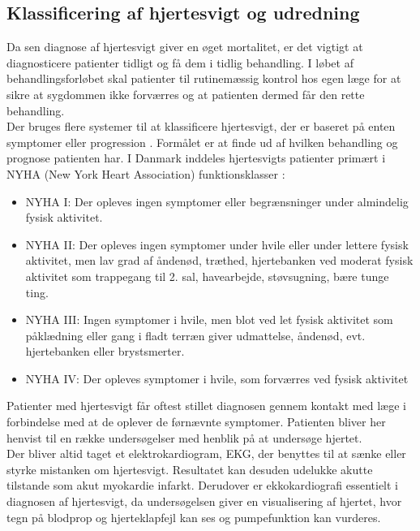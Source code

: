 \subsection{Klassificering af hjertesvigt og udredning}
Da sen diagnose af hjertesvigt giver en øget mortalitet, er det vigtigt at diagnosticere patienter tidligt og få dem i tidlig behandling. I løbet af behandlingsforløbet skal patienter til rutinemæssig kontrol hos egen læge for at sikre at sygdommen ikke forværres og at patienten dermed får den rette behandling. \citep{heartfailure}\\
Der bruges flere systemer til at klassificere hjertesvigt, der er baseret på enten symptomer eller progression \citep{heartfailure}. Formålet er at finde ud af hvilken behandling og prognose patienten har. I Danmark inddeles hjertesvigts patienter primært i NYHA (New York Heart Association) funktionsklasser \citep{DCS}:

\begin{itemize} 
\item NYHA I: Der opleves ingen symptomer eller begrænsninger under almindelig fysisk aktivitet.
\item NYHA II: Der opleves ingen symptomer under hvile eller under lettere fysisk aktivitet, men lav grad af åndenød, træthed, hjertebanken ved moderat fysisk aktivitet som trappegang til 2. sal, havearbejde, støvsugning, bære tunge ting.
\item NYHA III:  Ingen symptomer i hvile, men blot ved let fysisk aktivitet som påklædning eller gang i fladt terræn giver udmattelse, åndenød, evt. hjertebanken eller brystsmerter.
\item NYHA IV: Der opleves symptomer i hvile, som forværres ved fysisk aktivitet
\end{itemize}

Patienter med hjertesvigt får oftest stillet diagnosen gennem kontakt med læge i forbindelse med at de oplever de førnævnte symptomer. Patienten bliver her henvist til en række undersøgelser med henblik på at undersøge hjertet. \citep{heartfailure}\\
Der bliver altid taget et elektrokardiogram, EKG, der benyttes til at sænke eller styrke mistanken om hjertesvigt. Resultatet kan desuden udelukke akutte tilstande som akut myokardie infarkt. Derudover er ekkokardiografi essentielt i diagnosen af hjertesvigt, da undersøgelsen giver en visualisering af hjertet, hvor tegn på blodprop og hjerteklapfejl kan ses og pumpefunktion kan vurderes. \citep{heartfailure}\citep{DCS}